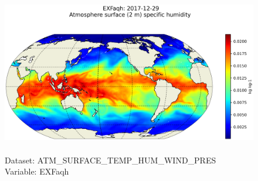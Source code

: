 \begin{figure}[H]
\centering
\includegraphics[scale=0.5]{../images/plots/latlon_plots/Atmosphere_Surface_Temperature_Humidity_Wind_and_Pressure/EXFaqh.png}
\caption{\\Dataset: ATM\_SURFACE\_TEMP\_HUM\_WIND\_PRES\\Variable: EXFaqh}
\label{tab:table-ATM_SURFACE_TEMP_HUM_WIND_PRES_EXFaqh-Plot}
\end{figure}
\pagebreak
